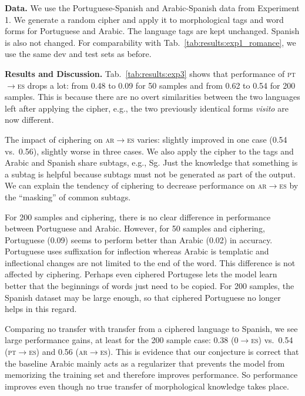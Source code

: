 \documentclass[11pt,letterpaper]{article}
\newcommand{\word}[1]{{\em #1}}
\newcommand{\mtag}[1]{{\small{\textsf{#1}}}}
\newcommand{\transfintabletxt}[1]{\textsc{#1}}
\def\tabref#1{Tab.~\ref{tab:#1}}
\begin{document}
\textbf{Data.}  We use the Portuguese-Spanish and
Arabic-Spanish data from Experiment 1.  We generate a
random cipher and apply it to morphological tags and word
forms for Portuguese and Arabic.  The
language tags are kept unchanged.  Spanish is also not
changed.  For comparability with 
\tabref{results:exp1_romance},
we use the same dev and test sets as before.


\textbf{Results and Discussion.}
\tabref{results:exp3} shows that
performance of
\transfintabletxt{pt}$\rightarrow$\transfintabletxt{es}
drops a lot: from 0.48 to 0.09 for 50 samples and from 0.62
to 0.54 for 200 samples. This is because there are no overt
similarities between the two languages left after applying
the cipher, e.g., the two previously identical forms
\word{visito} are now different. 


The impact of ciphering on
\transfintabletxt{ar}$\rightarrow$\transfintabletxt{es}
  varies: slightly improved in one case (0.54 vs.\ 0.56),
slightly worse in three cases. We also apply the
cipher to the tags and Arabic and Spanish share subtags,
e.g., \mtag{Sg}. 
Just the knowledge that something is a subtag is helpful
because subtags must not be generated as part of the output.
We can explain the tendency of ciphering to decrease
performance on
\transfintabletxt{ar}$\rightarrow$\transfintabletxt{es} 
by the ``masking'' of common subtags.


For 200 samples and ciphering, there is no clear  difference in
performance between Portuguese and Arabic.
However, for 50 samples and ciphering, Portuguese 
(0.09) seems to perform better than Arabic (0.02) in accuracy.
Portuguese uses suffixation for inflection whereas Arabic is
templatic and inflectional changes are not limited to the
end of the word. This difference is not affected by
ciphering. 
Perhaps even ciphered Portugese lets the model learn better that the beginnings
of words just need to be copied. 
For 200 samples, the
Spanish dataset may be large enough, so that ciphered
Portuguese no longer helps in this regard.


Comparing no transfer
with transfer from a ciphered language to Spanish, we
see large performance gains, at least for the 200 sample
case: 0.38
(\transfintabletxt{0}$\rightarrow$\transfintabletxt{es})
vs.\
0.54
(\transfintabletxt{pt}$\rightarrow$\transfintabletxt{es})
and 0.56
(\transfintabletxt{ar}$\rightarrow$\transfintabletxt{es}). 
This
is evidence that our conjecture is correct that the baseline
Arabic mainly acts as a regularizer that prevents the model
from memorizing the training set and therefore improves
performance. So performance improves even though no true
transfer of morphological knowledge takes place. 
\end{document}
